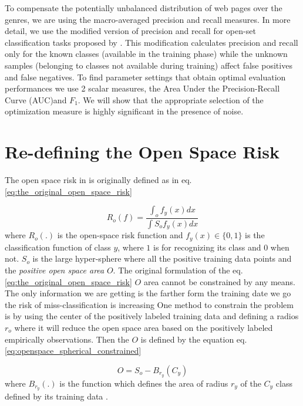 To compensate the potentially unbalanced distribution of web pages over the genres, we are using the macro-averaged precision and recall measures. In more detail, we use the modified version of precision and recall for open-set classification tasks proposed by \citep{mendesjunior2016}. This modification calculates precision and recall only for the known classes (available in the training phase) while the unknown samples (belonging to classes not available during training) affect false positives and false negatives. To find parameter settings that obtain optimal evaluation performances we use 2 scalar measures, the Area Under the Precision-Recall Curve (AUC)and $F_{1}$. We will show that the appropriate selection of the optimization measure is highly significant in the presence of noise.

\section{Re-defining the Open Space Risk}\label{chap:eval_mentods:sec:open_space_risk} 

The open space risk in \cite{scheirer2013toward} is originally defined as in eq. \ref{eq:the_original_open_space_risk}

\begin{equation}\label{eq:the_origina_open_space_risk}
	R_{o}(f) = \frac{\int_{o} f_{y}(x) dx}{\int{S_{o}}  f_{y}(x) dx}
\end{equation}
where $R_{o}(.)$ is the open-space risk function and $f_{y}(x)  \in \{0, 1\}$ is the classification function of class $y$, where $1$ is for recognizing its class and $0$ when not. $S_{o}$ is the large hyper-sphere where all the positive training data points and the \textit{positive open space area} $O$. 
The original formulation of the eq. \ref{eq:the_original_open_space_risk} $O$ area cannot be constrained by any means. The only information we are getting is the farther form the training date we go the risk of miss-classification is increasing One method to constrain the problem is by using the center of the positively labeled training data and defining a radios $r_{o}$ where it will reduce the open space area based on the positively labeled empirically observations. Then the $O$ is defined by the equation eq. \ref{eq:openspace_spherical_constrained}

\begin{equation}\label{eq:openspace_spherical_constrained}
	O = S_{o} - B_{r_{y}}(C_{y})
\end{equation}
where $B_{r_{y}}(.)$ is the function which defines the area of radius $r_{y}$ of the $C_{y}$ class defined by its training data \parencite{fei2016breaking}.

